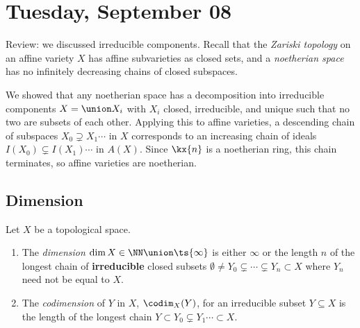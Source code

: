 \hypertarget{tuesday-september-08}{%
\section{Tuesday, September 08}\label{tuesday-september-08}}

Review: we discussed irreducible components. Recall that the
\emph{Zariski topology} on an affine variety \(X\) has affine
subvarieties as closed sets, and a \emph{noetherian space} has no
infinitely decreasing chains of closed subspaces.

We showed that any noetherian space has a decomposition into irreducible
components \(X = \union X_i\) with \(X_i\) closed, irreducible, and
unique such that no two are subsets of each other. Applying this to
affine varieties, a descending chain of subspaces
\(X_0 \supsetneq X_1 \cdots\) in \(X\) corresponds to an increasing
chain of ideals \(I(X_0) \subsetneq I(X_1) \cdots\) in \(A(X)\). Since
\(\kx{n}\) is a noetherian ring, this chain terminates, so affine
varieties are noetherian.

\hypertarget{dimension}{%
\subsection{Dimension}\label{dimension}}

\begin{definition}[Dimensions]

Let \(X\) be a topological space.

\begin{enumerate}
\def\labelenumi{\arabic{enumi}.}
\item
  The \emph{dimension} \(\dim X \in \NN\union\ts{\infty}\) is either
  \(\infty\) or the length \(n\) of the longest chain of
  \textbf{irreducible} closed subsets
  \(\emptyset \neq Y_0 \subsetneq \cdots \subsetneq Y_n \subset X\)
  where \(Y_n\) need not be equal to \(X\).
\item
  The \emph{codimension} of \(Y\) in \(X\), \(\codim_X(Y)\), for an
  irreducible subset \(Y\subseteq X\) is the length of the longest chain
  \(Y\subset Y_0 \subsetneq Y_1 \cdots \subset X\).
\end{enumerate}

\end{definition}

